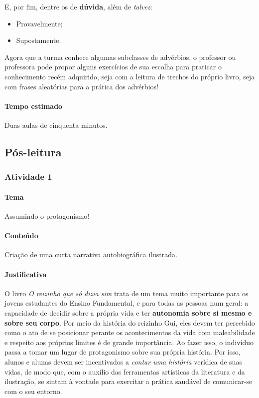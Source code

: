 \documentclass[11pt]{extarticle}
\begin{document}
E, por fim, dentre os de \textbf{dúvida}, além de \textit{talvez}:

\begin{itemize}
	\item Provavelmente;
	\item Supostamente.
\end{itemize}


Agora que a turma conhece algumas subclasses de advérbios, o professor ou professora
pode propor alguns exercícios de sua escolha para praticar o conhecimento recém adquirido,
seja com a leitura de trechos do próprio livro, seja com frases aleatórias para a prática
dos advérbios!


\paragraph{Tempo estimado} Duas aulas de cinquenta minutos.


\subsection{Pós-leitura}

\subsubsection{Atividade 1}

\paragraph{Tema} Assumindo o protagonismo! 

\paragraph{Conteúdo} Criação de uma curta narrativa autobiográfica ilustrada.

\paragraph{Justificativa} O livro \textit{O reizinho que só dizia sim}
trata de um tema muito importante para os jovens estudantes do Ensino Fundamental,
e para todas as pessoas num geral: a capacidade de decidir sobre a própria
vida e ter \textbf{autonomia sobre si mesmo e sobre seu corpo}. 
Por meio da história do reizinho Gui, 
eles devem ter percebido como o ato de se posicionar perante os acontecimentos
da vida com maleabilidade e respeito aos próprios limites é de grande importância.
Ao fazer isso, o indivíduo passa a tomar um lugar de protagonismo sobre sua própria história.
Por isso, alunos e alunas devem ser incentivados a \textit{contar uma história}
verídica de suas vidas, de modo que, com o auxílio das ferramentas artísticas
da literatura e da ilustração, se sintam à vontade para exercitar a prática saudável de 
comunicar-se com o seu entorno. 
\end{document}
